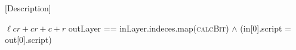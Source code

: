 

\begin{algorithm}[H]
\caption{[Description]}
\label{alg:isRule110}
\begin{algorithmic}[1]
    \State
    \Return $\ell c r + cr + c + r$ 
    \EndFunction
    \State \Return outLayer == inLayer.indeces.map(\textsc{calcBit})
    \EndFunction
    \State
    \Return {}
    $\wedge$ (in[0].script = out[0].script)
    \EndFunction
\end{algorithmic}
\end{algorithm}
